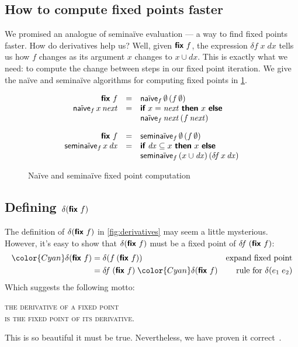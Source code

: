 \documentclass[sigplan,screen,review,timestamp,dvipsnames]{acmart}
\newcommand{\hilited}{\color{Cyan}}
\newcommand{\naive}{na\"ive}
\renewcommand{\d}{\delta}
\newcommand{\kw}[1]{\textsf{\bfseries #1}}
\newcommand{\tlv}[1]{\textsf{#1}}
\newcommand{\var}[1]{\mathit{#1}}
\newcommand{\dee}[1]{\var{d#1}}
\newcommand{\efix}{\kw{fix}~}
\begin{document}

\subsection{How to compute fixed points faster}

We promised an analogue of semi\naive{} evaluation --- a way to find fixed
points faster. How do derivatives help us? Well, given $\efix f$, the expression
$\d\!f \;x \;dx$ tells us how $f$ changes as its argument $x$ changes to $x \cup
dx$. This is exactly what we need: to compute the change between steps in our
fixed point iteration. We give the na\"ive and semina\"ive algorithms for computing fixed points in \cref{fig:defining-fix}.

\begin{figure}
  \[
  \begin{array}{rcl}
  \efix f &=& \tlv{\naive}_f \,\emptyset \,(f\, \emptyset)\\
  \tlv{\naive}_f \,x \,\var{next}
  &=& \kw{if}~ x = \var{next} ~\kw{then}~ x ~\kw{else}\\
  && \tlv{\naive}_f \,\var{next} \,(f \,\var{next})

  \vspace{1em}\\

  \efix f &=& \tlv{semi\naive}_f \,\emptyset \,(f\, \emptyset)\\
  \tlv{semi\naive}_f \,x \,\dee x
  &=& \kw{if}~ \dee x \subseteq x ~\kw{then}~ x ~\kw{else}\\
  && \tlv{semi\naive}_f \,(x \cup \dee x) \,(\d\!f \,x \,\dee x)
  \end{array}
  \]
  \vspace{-.5em}
  \caption{Na\"ive and semina\"ive fixed point computation}
  \label{fig:defining-fix}
\end{figure}

\subsection{Defining \texorpdfstring{$\d(\efix f)$}{d(fix f)}}

The definition of $\d(\efix f)$ in \cref{fig:derivatives} may seem a little
mysterious. However, it's easy to show that $\d(\efix f)$ must be a fixed point
of $\d\!f\;(\efix f)$:
%
\begin{align*}
  {\hilited \d(\efix f)}
  &= \d(f\: (\efix f))
  & \text{expand fixed point}\\
  &= \d\!f\; (\efix f)\; {\hilited \d(\efix f)}
  & \text{rule for}~\delta(e_1\;e_2)
\end{align*}
%
Which suggests the following motto:
\begin{center}
  \large \scshape
  the derivative of a fixed point\nopagebreak\\
  is the fixed point of its derivative.
\end{center}
%
This is so beautiful it must be true. Nevertheless, we have proven it
correct~\citep{fixderiv}.
\end{document}
